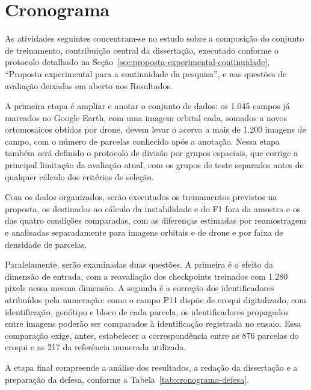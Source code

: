\chapter{Cronograma}
\label{cap:cronograma}

As atividades seguintes concentram-se no estudo sobre a composi\c{c}\~ao do conjunto de treinamento, contribui\c{c}\~ao central da disserta\c{c}\~ao, executado conforme o protocolo detalhado na Se\c{c}\~ao~\ref{sec:proposta-experimental-continuidade}, ``Proposta experimental para a continuidade da pesquisa'', e nas quest\~oes de avalia\c{c}\~ao deixadas em aberto nos Resultados.

A primeira etapa \'e ampliar e anotar o conjunto de dados: os 1.045 campos j\'a marcados no Google Earth, com uma imagem orbital cada, somados a novos ortomosaicos obtidos por drone, devem levar o acervo a mais de 1.200 imagens de campo, com o n\'umero de parcelas conhecido ap\'os a anota\c{c}\~ao. Nessa etapa tamb\'em ser\'a definido o protocolo de divis\~ao por grupos espaciais, que corrige a principal limita\c{c}\~ao da avalia\c{c}\~ao atual, com os grupos de teste separados antes de qualquer c\'alculo dos crit\'erios de sele\c{c}\~ao.

Com os dados organizados, ser\~ao executados os treinamentos previstos na proposta, os destinados ao c\'alculo da instabilidade e do F1 fora da amostra e os das quatro condi\c{c}\~oes comparadas, com as diferen\c{c}as estimadas por reamostragem e analisadas separadamente para imagens orbitais e de drone e por faixa de densidade de parcelas.

Paralelamente, ser\~ao examinadas duas quest\~oes. A primeira \'e o efeito da dimens\~ao de entrada, com a reavalia\c{c}\~ao dos checkpoints treinados com 1.280 pixels nessa mesma dimens\~ao. A segunda \'e a corre\c{c}\~ao dos identificadores atribu\'idos pela numera\c{c}\~ao: como o campo P11 disp\~oe de croqui digitalizado, com identifica\c{c}\~ao, gen\'otipo e bloco de cada parcela, os identificadores propagados entre imagens poder\~ao ser comparados \`a identifica\c{c}\~ao registrada no ensaio. Essa compara\c{c}\~ao exige, antes, estabelecer a correspond\^encia entre as 876 parcelas do croqui e as 217 da refer\^encia numerada utilizada.

A etapa final compreende a an\'alise dos resultados, a reda\c{c}\~ao da disserta\c{c}\~ao e a prepara\c{c}\~ao da defesa, conforme a Tabela~\ref{tab:cronograma-defesa}.

